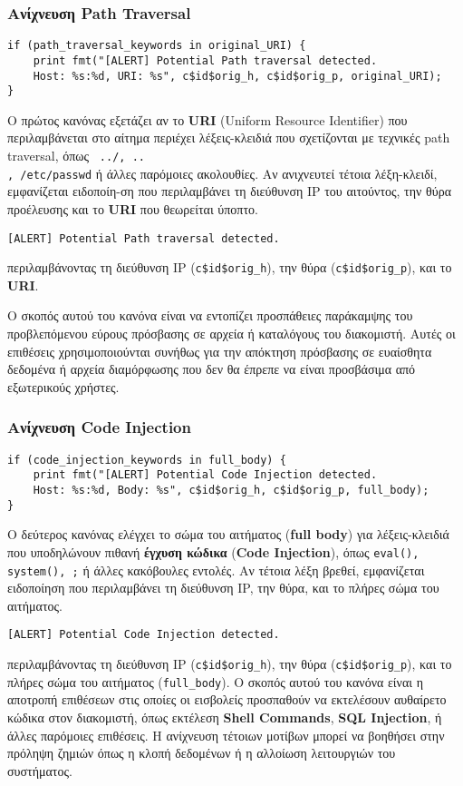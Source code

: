 \subsubsection{Ανίχνευση Path Traversal}
\begin{lstlisting}
if (path_traversal_keywords in original_URI) {
    print fmt("[ALERT] Potential Path traversal detected. 
    Host: %s:%d, URI: %s", c$id$orig_h, c$id$orig_p, original_URI);
}
\end{lstlisting}
Ο πρώτος κανόνας εξετάζει αν το \textbf{URI} (Uniform Resource Identifier) που περιλαμβάνεται στο αίτημα περιέχει λέξεις-κλειδιά που σχετίζονται με τεχνικές path traversal, όπως \texttt{ ../, ..\\, /etc/passwd} ή άλλες παρόμοιες ακολουθίες. Αν ανιχνευτεί τέτοια λέξη-κλειδί, εμφανίζεται ειδοποίη-ση που περιλαμβάνει τη διεύθυνση IP του αιτούντος, την θύρα προέλευσης και το \textbf{URI} που θεωρείται ύποπτο.
\begin{lstlisting}
[ALERT] Potential Path traversal detected.
\end{lstlisting}
περιλαμβάνοντας τη διεύθυνση IP (\texttt{c\$id\$orig\_h}), την θύρα (\texttt{c\$id\$orig\_p}), και το \textbf{URI}.

Ο σκοπός αυτού του κανόνα είναι να εντοπίζει προσπάθειες παράκαμψης του προβλεπόμενου εύρους πρόσβασης σε αρχεία ή καταλόγους του διακομιστή. Αυτές οι επιθέσεις χρησιμοποιούνται συνήθως για την απόκτηση πρόσβασης σε ευαίσθητα δεδομένα ή αρχεία διαμόρφωσης που δεν θα έπρεπε να είναι προσβάσιμα από εξωτερικούς χρήστες.

\subsubsection{Ανίχνευση Code Injection}
\begin{lstlisting}
if (code_injection_keywords in full_body) {
    print fmt("[ALERT] Potential Code Injection detected. 
    Host: %s:%d, Body: %s", c$id$orig_h, c$id$orig_p, full_body);
}
\end{lstlisting}
Ο δεύτερος κανόνας ελέγχει το σώμα του αιτήματος (\textbf{full body}) για λέξεις-κλειδιά που υποδηλώνουν πιθανή \textbf{έγχυση κώδικα} (\textbf{Code Injection}), όπως \texttt{eval(), system(), ;} ή άλλες κακόβουλες εντολές. Αν τέτοια λέξη βρεθεί, εμφανίζεται ειδοποίηση που περιλαμβάνει τη διεύθυνση IP, την θύρα, και το πλήρες σώμα του αιτήματος.
\begin{lstlisting}
[ALERT] Potential Code Injection detected.
\end{lstlisting}
περιλαμβάνοντας τη διεύθυνση IP (\texttt{c\$id\$orig\_h}), την θύρα (\texttt{c\$id\$orig\_p}), και το πλήρες σώμα του αιτήματος (\texttt{full\_body}).
Ο σκοπός αυτού του κανόνα είναι η αποτροπή επιθέσεων στις οποίες οι εισβολείς προσπαθούν να εκτελέσουν αυθαίρετο κώδικα στον διακομιστή, όπως εκτέλεση \textbf{Shell Commands}, \textbf{SQL Injection}, ή άλλες παρόμοιες επιθέσεις. Η ανίχνευση τέτοιων μοτίβων μπορεί να βοηθήσει στην πρόληψη ζημιών όπως η κλοπή δεδομένων ή η αλλοίωση λειτουργιών του συστήματος.

